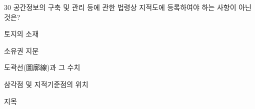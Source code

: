 \begin{question}{30}
공간정보의 구축 및 관리 등에 관한 법령상 지적도에 등록하여야 하는 사항이 아닌 것은?
\begin{choices}
  \item 토지의 소재
  \item 소유권 지분
  \item 도곽선(圖廓線)과 그 수치
  \item 삼각점 및 지적기준점의 위치
  \item 지목
\end{choices}
\end{question}
